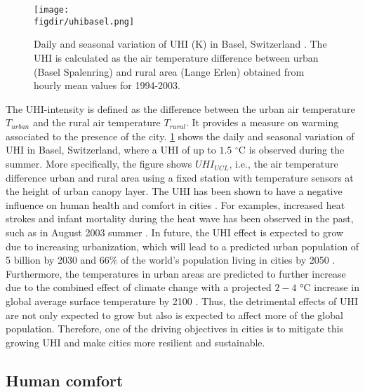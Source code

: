 	\begin{figure}[t]
		\centering
		\texttt{[image: \\figdir/uhibasel.png]}
		\caption{Daily and seasonal variation of UHI (K) in Basel, Switzerland \citep{Parlow2014}. The UHI is calculated as the air temperature difference between urban (Basel Spalenring) and rural area (Lange Erlen) obtained from hourly mean values for 1994-2003.}
		\label{fig:uhibasel}
	\end{figure}
The UHI-intensity is defined as the difference between the urban air temperature $T_{\textit{urban}}$ and the rural air temperature $T_{\textit{rural}}$. It provides a measure on warming associated to the presence of the city. \cref{fig:uhibasel} shows the daily and seasonal variation of UHI in Basel, Switzerland, where a UHI of up to $1.5$ $^{\circ}$C is observed during the summer. More specifically, the figure shows $UHI_{\textit{UCL}}$, i.e., the air temperature difference urban and rural area using a fixed station with temperature sensors at the  height of urban canopy layer. The UHI has been shown to have a negative influence on human health and comfort in cities \citep{santamouris2001energy,Kovats2008,Salmond2016}. For examples, increased heat strokes and infant mortality during the heat wave has been observed in the past, such as in August 2003 summer \citep{Fouillet2006}. In future, the UHI effect is expected to grow due to increasing urbanization, which will lead to a predicted urban population of 5 billion by 2030 and 66\% of the world’s population living in cities by 2050 \citep{Seto2012, UnitedNations2015}. Furthermore, the temperatures in urban areas are predicted to further increase due to the combined effect of climate change with a projected $2-4$ \si{\celsius} increase in global average surface temperature by 2100 \citep{pachauri2014climate}. Thus, the detrimental effects of UHI are not only expected to grow but also is expected to affect more of the global population. Therefore, one of the driving objectives in cities is to mitigate this growing UHI and make cities more resilient and sustainable. 

\subsection{Human comfort}

